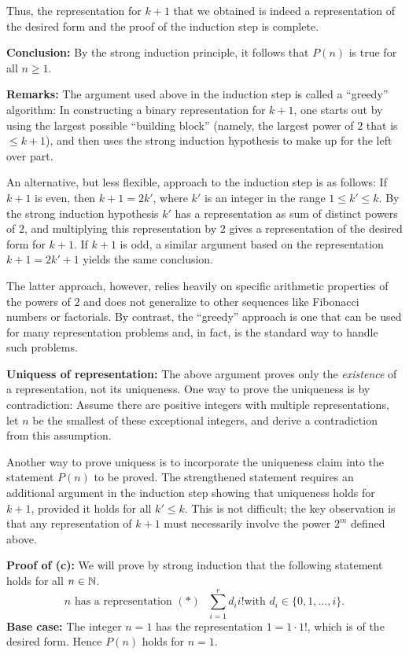 Thus, the representation for $k+1$ that we obtained is indeed a
representation of the desired form and the proof of the 
induction step is complete.

\textbf{Conclusion:} By the strong induction principle, 
it follows that $P(n)$  is true for all $n\ge1$.

\bigskip

\textbf{Remarks:} The argument used above in the induction step is called a
``greedy'' algorithm: In constructing a binary representation for $k+1$, one
starts  out by using the largest possible ``building block'' (namely, the
largest power of $2$ that is $\le k+1$), and then uses the strong induction
hypothesis to make up for the left over part. 


An alternative, but less flexible, approach to the induction step is as
follows: If $k+1$ is even, then $k+1=2k'$, where $k'$ is an integer in
the range $1\le k'\le k$. By the strong induction hypothesis $k'$
has a representation as sum of distinct powers of $2$, and multiplying this
representation by $2$ gives a representation of the desired form for $k+1$. 
If $k+1$ is odd, a similar argument based on the representation $k+1=2k'+1$
yields the same conclusion. 

The latter approach, however, relies heavily on specific arithmetic properties
of the powers of $2$ and does not generalize to other sequences like Fibonacci
numbers or factorials. By contrast, the ``greedy'' approach is one that can be
used for many representation problems and, in fact, is the standard way to
handle such problems.

\bigskip

\textbf{Uniquess of representation:} The above argument proves only the
\emph{existence} of a representation, not its uniqueness.  One way to prove the
uniqueness is by contradiction: Assume there are positive integers with
multiple representations, let $n$  be the smallest of these exceptional
integers, and derive a contradiction from this assumption.

Another way to prove uniquess is to incorporate the uniqueness claim into the
statement $P(n)$ to be proved. The strengthened statement requires an additional
argument in the induction step showing that uniqueness holds for $k+1$,
provided it holds for all $k'\le k$. This is not difficult; the key observation
is that any representation of $k+1$ must necessarily involve the power $2^m$ 
defined above.

\textbf{Proof of (c):}
We will prove by strong induction that the following statement  
holds for all $n\in\mathbb{N}$.
\[
\text{$n$ has a representation 
$(*)$ $\sum_{i=1}^rd_ii!$
with $d_i\in\{0,1,\dots,i\}$.}
\tag{$P(n)$}
\]
\textbf{Base case:} The integer $n=1$ has the representation $1=1\cdot 1!$,
which is of the desired form. Hence $P(n)$ holds for $n=1$.


